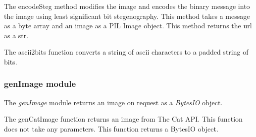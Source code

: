\documentclass[letterpaper,12pt,openany,oneside]{sphinxmanual}
\begin{document}
\begin{fulllineitems}
\begin{fulllineitems}
\end{fulllineitems}


\begin{fulllineitems}
\label{Image_Manipulation:Image_Manipulation.lsbsteg.Steg.encodeSteg}
The encodeSteg method modifies the image and encodes the binary
message into the image using least significant bit stegenography.
This method takes a message as a byte array and an image as a
PIL Image object.
This method returns the url as a str.

\end{fulllineitems}


\end{fulllineitems}


\begin{fulllineitems}
\label{Image_Manipulation:Image_Manipulation.lsbsteg.ascii2bits}
The ascii2bits function converts a string of ascii characters to a
padded string of bits.

\end{fulllineitems}



\subsubsection{genImage module}
\label{Image_Manipulation:module-Image_Manipulation.genImage}\label{Image_Manipulation:genimage-module}
The \emph{genImage} module returns an image on request as a \emph{BytesIO} object.

\begin{fulllineitems}
\label{Image_Manipulation:Image_Manipulation.genImage.genCatImage}
The genCatImage function returns an image from The Cat API.
This function does not take any parameters.
This function returns a BytesIO object.

\end{fulllineitems}
\end{document}
